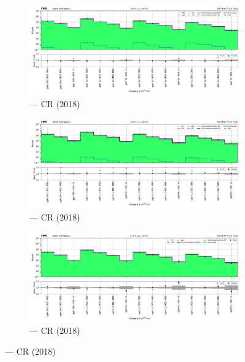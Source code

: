 \begin{figure}[htbp]
    \centering
    \begin{subfigure}[b]{0.66\textwidth}
        \includegraphics[width=\textwidth]{chapters/higgstoinv/figures/mountain_ranges/2018/ggF/Wmunu_tree_fit_s-abs_values_ggF_cats.pdf}
        \caption{\ggH --- \singleMuCr \gls{CR} (2018)}
    \end{subfigure}

    \begin{subfigure}[b]{0.66\textwidth}
        \includegraphics[width=\textwidth]{chapters/higgstoinv/figures/mountain_ranges/2018/ggF/Wenu_tree_fit_s-abs_values_ggF_cats.pdf}
        \caption{\ggH --- \singleEleCr \gls{CR} (2018)}
    \end{subfigure}

    \begin{subfigure}[b]{0.66\textwidth}
        \includegraphics[width=\textwidth]{chapters/higgstoinv/figures/mountain_ranges/2018/ggF/Zmumu_tree_fit_s-abs_values_ggF_cats.pdf}
        \caption{\ggH --- \doubleMuCr \gls{CR} (2018)}
    \end{subfigure}


\end{figure}
